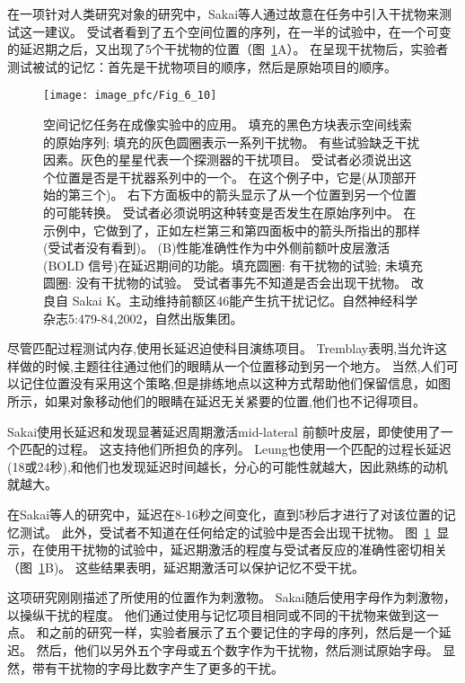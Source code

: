 在一项针对人类研究对象的研究中，Sakai等人\cite{sakai2002active}通过故意在任务中引入干扰物来测试这一建议。
受试者看到了五个空间位置的序列，在一半的试验中，在一个可变的延迟期之后，又出现了5个干扰物的位置（图~\ref{fig:6_10}A）。
在呈现干扰物后，实验者测试被试的记忆：首先是干扰物项目的顺序，然后是原始项目的顺序。


\begin{figure}
	\centering
	\texttt{[image: image\_pfc/Fig\_6\_10]}
	\caption{空间记忆任务在成像实验中的应用。
		填充的黑色方块表示空间线索的原始序列; 填充的灰色圆圈表示一系列干扰物。
		有些试验缺乏干扰因素。灰色的星星代表一个探测器的干扰项目。
		受试者必须说出这个位置是否是干扰器系列中的一个。
		在这个例子中，它是(从顶部开始的第三个)。
		右下方面板中的箭头显示了从一个位置到另一个位置的可能转换。
		受试者必须说明这种转变是否发生在原始序列中。
		在示例中，它做到了，正如左栏第三和第四面板中的箭头所指出的那样(受试者没有看到)。
		(B)性能准确性作为中外侧前额叶皮层激活(BOLD 信号)在延迟期间的功能。填充圆圈: 有干扰物的试验; 未填充圆圈: 没有干扰物的试验。
		受试者事先不知道是否会出现干扰物。
		改良自 Sakai K。主动维持前额区46能产生抗干扰记忆。自然神经科学杂志5:479-84,2002，自然出版集团。}
	\label{fig:6_10}
\end{figure}


尽管匹配过程测试内存,使用长延迟迫使科目演练项目。
Tremblay\cite{tremblay2006rehearsal}表明,当允许这样做的时候,主题往往通过他们的眼睛从一个位置移动到另一个地方。
当然,人们可以记住位置没有采用这个策略,但是排练地点以这种方式帮助他们保留信息，如图所示，如果对象移动他们的眼睛在延迟无关紧要的位置,他们也不记得项目\cite{guerard2009processing}。


Sakai\cite{sakai2002active}使用长延迟和发现显著延迟周期激活mid-lateral 前额叶皮层，即使使用了一个匹配的过程。
这支持他们所担负的序列。
Leung\cite{leung2002sustained}也使用一个匹配的过程长延迟(18或24秒),和他们也发现延迟时间越长，分心的可能性就越大，因此熟练的动机就越大。


在Sakai等人\cite{sakai2002active}的研究中，延迟在8-16秒之间变化，直到5秒后才进行了对该位置的记忆测试。
此外，受试者不知道在任何给定的试验中是否会出现干扰物。
图~\ref{fig:6_10}~显示，在使用干扰物的试验中，延迟期激活的程度与受试者反应的准确性密切相关（图~\ref{fig:6_10}B)。
这些结果表明，延迟期激活可以保护记忆不受干扰。


这项研究刚刚描述了所使用的位置作为刺激物。
Sakai\cite{sakai2004prefrontal}随后使用字母作为刺激物，以操纵干扰的程度。
他们通过使用与记忆项目相同或不同的干扰物来做到这一点。
和之前的研究一样，实验者展示了五个要记住的字母的序列，然后是一个延迟。
然后，他们以另外五个字母或五个数字作为干扰物，然后测试原始字母。
显然，带有干扰物的字母比数字产生了更多的干扰。


